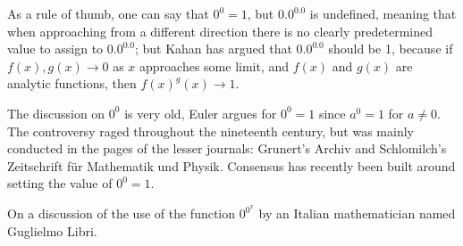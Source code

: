     As a rule of thumb, one can say that $0^0 = 1$, but $0.0^{0.0}$ is
    undefined, meaning that when approaching from a different
    direction there is no clearly predetermined value to assign to
    $0.0^{0.0}$; but Kahan has argued that $0.0^{0.0}$ should be 1,
    because if $f(x), g(x) \rightarrow 0$ as $x$ approaches some
    limit, and $f(x)$ and $g(x)$ are analytic functions, then
    $f(x)^g(x) \rightarrow 1$.


    The discussion on $0^0$ is very old, Euler argues for $0^0=1$
    since $a^0=1$ for $a \neq 0$. The controversy raged throughout the
    nineteenth century, but was mainly conducted in the pages of the
    lesser journals: Grunert's Archiv and Schlomilch's Zeitschrift f\"ur 
    Mathematik und Physik. Consensus has recently been built around 
    setting the value of $0^0=1$.

    On a discussion of the use of the function $0^{0^x}$ by an Italian
    mathematician named Guglielmo Libri.

